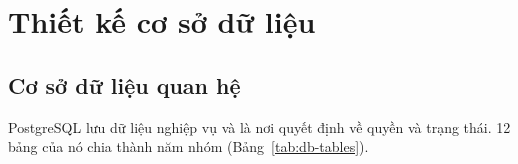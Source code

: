 \section{Thiết kế cơ sở dữ liệu}
\label{sec:5.3}

\subsection{Cơ sở dữ liệu quan hệ}
\label{sec:5.3.1}

PostgreSQL lưu dữ liệu nghiệp vụ và là nơi quyết định về quyền và trạng thái. 12 bảng của nó chia thành năm nhóm (Bảng~\ref{tab:db-tables}).

